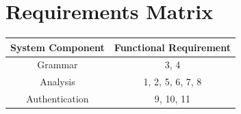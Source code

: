 \documentclass[12pt]{article}
\begin{document}
\section{Requirements Matrix}
\begin{center}
  \begin{tabular}{|c|c|}
    \hline
    System Component & Functional Requirement \\
    \hline\hline
    Grammar          & 3, 4                   \\
    \hline
    Analysis         & 1, 2, 5, 6, 7, 8       \\
    \hline
    Authentication   & 9, 10, 11              \\
    \hline
  \end{tabular}
\end{center}
\end{document}
